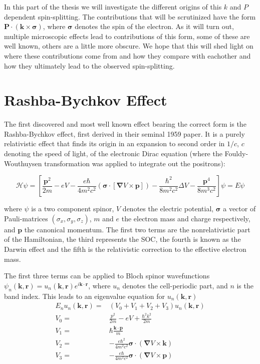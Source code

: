 In this part of the thesis we will investigate the different origins of this $k$ and $P$ dependent spin-splitting. The contributions that will be scrutinized have the form $\mathbf{P} \cdot (\mathbf{k} \times \mathbf{\sigma})$, where $\mathbf{\sigma}$ denotes the spin of the electron. As it will turn out, multiple microscopic effects lead to contributions of this form, some of these are well known, others are a little more obscure. We hope that this will shed light on where these contributions come from and how they compare with eachother and how they ultimately lead to the observed spin-splitting.

\section{Rashba-Bychkov Effect}
The first discovered and most well known effect bearing the correct form is the Rashba-Bychkov effect, first derived in their seminal 1959 paper\cite{Rashba1959SymmetryAr}. It is a purely relativistic effect that finds its origin in an expansion to second order in $1/c$, $c$ denoting the speed of light, of the electronic Dirac equation (where the Fouldy-Wouthuysen transformation was applied to integrate out the positrons):

\begin{equation}
	\mathcal{H} \psi = \left[\frac{\bm{p}^2}{2m} - e V - \frac{e \hbar}{4m^2c^2}(\bm{\sigma}\cdot[\bm{\nabla}V \times \bm{p}]) - \frac{\hbar^2}{8m^2c^2} \Delta V - \frac{\bm{p}^4}{8m^3c^2}\right]\psi = E\psi
\end{equation}

where $\psi$ is a two component spinor, $V$ denotes the electric potential, $\bm{\sigma}$ a vector of Pauli-matrices $(\sigma_x, \sigma_y, \sigma_z)$, $m$ and $e$ the electron mass and charge respectively, and $\bm{p}$ the canonical momentum. The first two terms are the nonrelativistic part of the Hamiltonian, the third represents the SOC, the fourth is known as the Darwin effect and the fifth is the relativistic correction to the effective electron mass. 

The first three terms can be applied to Bloch spinor wavefunctions $\psi_n(\bm{k}, \bm{r}) = u_n(\bm{k}, \bm{r})e^{i\bm{k}\cdot\bm{r}}$, where $u_n$ denotes the cell-periodic part, and $n$ is the band index. This leads to an eigenvalue equation for $u_n(\bm{k}, \bm{r})$
\begin{align}
	E_n u_n(\bm{k}, \bm{r}) =& \left(V_0 + V_1  +  V_2 + V_3 \right) u_n(\bm{k}, \bm{r}) \\
	V_0 =& \frac{p^2}{2m} - eV + \frac{\hbar^2 k^2}{2m} \\
	V_1 =& \hbar\frac{\bm{k}\cdot\bm{p}}{m} \\
	V_2 =& -\frac{e \hbar^2}{4m^2c^2} \bm{\sigma} \cdot ( \bm{\nabla}V \times \bm{k}) \\
	V_3 =& -\frac{e \hbar}{4m^2c^2} \bm{\sigma} \cdot ( \bm{\nabla}V \times \bm{p})
\end{align}

